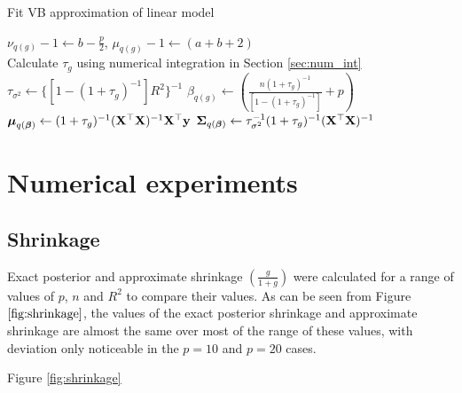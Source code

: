 \documentclass{amsart}[12pt]
\begin{document}
\begin{algorithm}
	\caption{Fit VB approximation of linear model}
	\label{alg:algorithm_two}
	\begin{algorithmic}
		\REQUIRE $\nu_{q(g)} - 1 \leftarrow b - \frac{p}{2}$, $\mu_{q(g)} - 1 \leftarrow (a + b + 2)$ \\
		\STATE Calculate $\tau_{g}$ using numerical integration in Section \ref{sec:num_int}
		\ENDWHILE
		\STATE $\tau_{\sigma^2} \leftarrow \{[1 - (1 + \tau_g)^{-1}] R^2\}^{-1}$
		\STATE $\beta_{q(g)} \leftarrow \left(\frac{n (1 + \tau_g)^{-1}}{[1 - (1 + \tau_g)^{-1}]} + p \right)$
		\STATE ${\boldsymbol \mu}_{q({\boldsymbol \beta})} \leftarrow (1 + \tau_g)^{-1} ({\bf X}^\top {\bf X})^{-1} {\bf X}^\top {\bf y}$
		\STATE ${\boldsymbol \Sigma}_{q({\boldsymbol \beta})} \leftarrow \tau_{\sigma^2}^{-1} (1 + \tau_{g})^{-1}({\bf X}^\top {\bf X})^{-1}$
	\end{algorithmic}
\end{algorithm}


\section{Numerical experiments}
\label{sec:num_exp}

\subsection{Shrinkage}

Exact posterior and approximate shrinkage $\left( \frac{g}{1 + g} \right)$ were calculated for a range of
values of $p$, $n$ and $R^2$ to compare their values. As can be seen from Figure $\ref{fig:shrinkage}$, the
values of the exact posterior shrinkage and approximate shrinkage are almost the same over most of the range
of these values, with deviation only noticeable in the $p=10$ and $p=20$ cases.

Figure \ref{fig:shrinkage}
\end{document}
